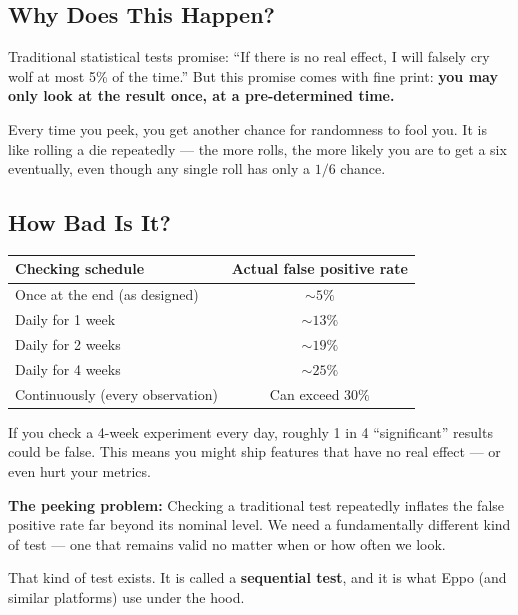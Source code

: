 \documentclass[12pt, a4paper]{article}
\begin{document}
\subsection{Why Does This Happen?}

\begin{intuition}
Traditional statistical tests promise: ``If there is no real effect, I will
falsely cry wolf at most 5\% of the time.''  But this promise comes with fine
print: \textbf{you may only look at the result once, at a pre-determined time.}

Every time you peek, you get another chance for randomness to fool you.  It is
like rolling a die repeatedly --- the more rolls, the more likely you are to
get a six eventually, even though any single roll has only a $1/6$ chance.
\end{intuition}

\subsection{How Bad Is It?}

\begin{center}
\renewcommand{\arraystretch}{1.3}
\begin{tabular}{@{} l c @{}}
\toprule
\textbf{Checking schedule} & \textbf{Actual false positive rate} \\
\midrule
Once at the end (as designed) & $\sim\!5\%$ \\
Daily for 1 week & $\sim\!13\%$ \\
Daily for 2 weeks & $\sim\!19\%$ \\
Daily for 4 weeks & $\sim\!25\%$ \\
Continuously (every observation) & Can exceed $30\%$ \\
\bottomrule
\end{tabular}
\end{center}

\begin{plainlanguage}
If you check a 4-week experiment every day, roughly 1 in 4 ``significant''
results could be false.  This means you might ship features that have
no real effect --- or even hurt your metrics.
\end{plainlanguage}

\begin{keytakeaway}
\textbf{The peeking problem:} Checking a traditional test repeatedly inflates
the false positive rate far beyond its nominal level.  We need a fundamentally
different kind of test --- one that remains valid no matter when or how often
we look.

That kind of test exists.  It is called a \textbf{sequential test}, and it is
what Eppo (and similar platforms) use under the hood.
\end{keytakeaway}
\end{document}
